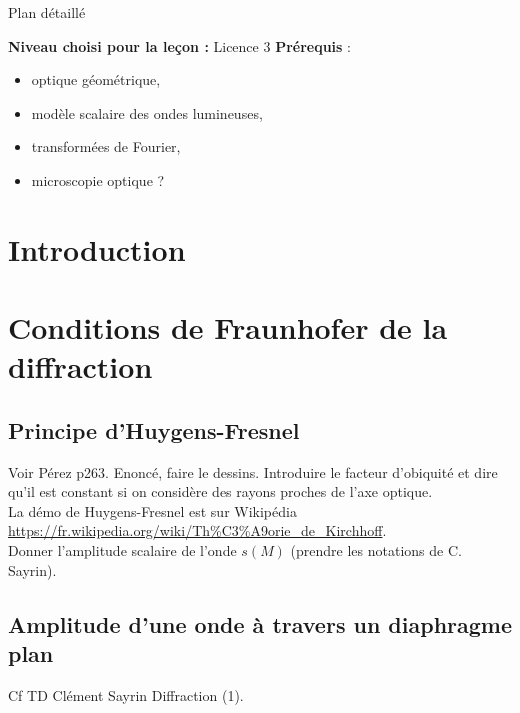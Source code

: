\begin{reportBlock}{Plan détaillé}

  \textbf{Niveau choisi pour la leçon :} Licence 3
  \newline
  \textbf{Prérequis} : 
  \begin{itemize}
      \item optique géométrique,
      \item modèle scalaire des ondes lumineuses,
      \item transformées de Fourier,
      \item microscopie optique ?
  \end{itemize}
  \section*{Introduction}
  
  \section{Conditions de Fraunhofer de la diffraction}

  \subsection{Principe d'Huygens-Fresnel} 
  Voir Pérez p263. Enoncé, faire le dessins. Introduire le facteur d'obiquité et dire qu'il est constant si on considère des rayons proches de l'axe optique.\\
  La démo de Huygens-Fresnel est sur Wikipédia \url{https://fr.wikipedia.org/wiki/Th\%C3\%A9orie_de_Kirchhoff}.\\
  Donner l'amplitude scalaire de l'onde $s(M)$ (prendre les notations de C. Sayrin).

  \subsection{Amplitude d'une onde à travers un diaphragme plan}
  Cf TD Clément Sayrin Diffraction (1).\\



\end{reportBlock}
